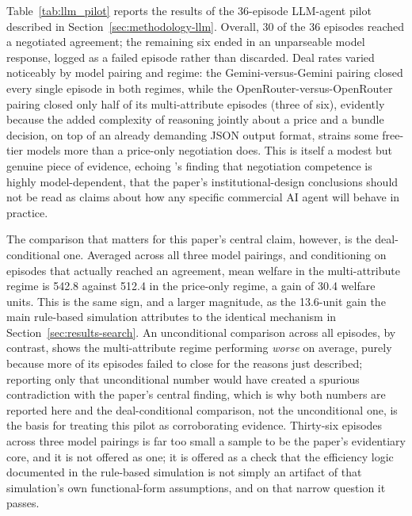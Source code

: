 \documentclass[review]{elsarticle}
\begin{document}
Table~\ref{tab:llm_pilot} reports the results of the 36-episode LLM-agent pilot described in Section~\ref{sec:methodology-llm}. Overall, 30 of the 36 episodes reached a negotiated agreement; the remaining six ended in an unparseable model response, logged as a failed episode rather than discarded. Deal rates varied noticeably by model pairing and regime: the Gemini-versus-Gemini pairing closed every single episode in both regimes, while the OpenRouter-versus-OpenRouter pairing closed only half of its multi-attribute episodes (three of six), evidently because the added complexity of reasoning jointly about a price and a bundle decision, on top of an already demanding JSON output format, strains some free-tier models more than a price-only negotiation does. This is itself a modest but genuine piece of evidence, echoing \citet{bianchi2024negotiationarena}'s finding that negotiation competence is highly model-dependent, that the paper's institutional-design conclusions should not be read as claims about how any specific commercial AI agent will behave in practice.

The comparison that matters for this paper's central claim, however, is the deal-conditional one. Averaged across all three model pairings, and conditioning on episodes that actually reached an agreement, mean welfare in the multi-attribute regime is 542.8 against 512.4 in the price-only regime, a gain of 30.4 welfare units. This is the same sign, and a larger magnitude, as the 13.6-unit gain the main rule-based simulation attributes to the identical mechanism in Section~\ref{sec:results-search}. An unconditional comparison across all episodes, by contrast, shows the multi-attribute regime performing \emph{worse} on average, purely because more of its episodes failed to close for the reasons just described; reporting only that unconditional number would have created a spurious contradiction with the paper's central finding, which is why both numbers are reported here and the deal-conditional comparison, not the unconditional one, is the basis for treating this pilot as corroborating evidence. Thirty-six episodes across three model pairings is far too small a sample to be the paper's evidentiary core, and it is not offered as one; it is offered as a check that the efficiency logic documented in the rule-based simulation is not simply an artifact of that simulation's own functional-form assumptions, and on that narrow question it passes.
\end{document}
